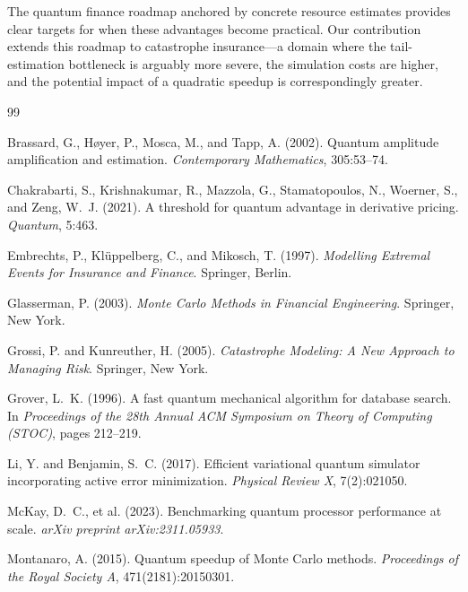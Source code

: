 \documentclass[11pt,a4paper]{article}
\begin{document}
The quantum finance roadmap anchored by concrete resource estimates \cite{Chakrabarti2021, Stamatopoulos2024} provides clear targets for when these advantages become practical. Our contribution extends this roadmap to catastrophe insurance---a domain where the tail-estimation bottleneck is arguably more severe, the simulation costs are higher, and the potential impact of a quadratic speedup is correspondingly greater.



\begin{thebibliography}{99}

Brassard, G., H{\o}yer, P., Mosca, M., and Tapp, A. (2002).
Quantum amplitude amplification and estimation.
\emph{Contemporary Mathematics}, 305:53--74.

Chakrabarti, S., Krishnakumar, R., Mazzola, G., Stamatopoulos, N., Woerner, S., and Zeng, W.~J. (2021).
A threshold for quantum advantage in derivative pricing.
\emph{Quantum}, 5:463.

Embrechts, P., Kl{\"u}ppelberg, C., and Mikosch, T. (1997).
\emph{Modelling Extremal Events for Insurance and Finance}.
Springer, Berlin.

Glasserman, P. (2003).
\emph{Monte Carlo Methods in Financial Engineering}.
Springer, New York.

Grossi, P. and Kunreuther, H. (2005).
\emph{Catastrophe Modeling: A New Approach to Managing Risk}.
Springer, New York.

Grover, L.~K. (1996).
A fast quantum mechanical algorithm for database search.
In \emph{Proceedings of the 28th Annual ACM Symposium on Theory of Computing (STOC)}, pages 212--219.

Li, Y. and Benjamin, S.~C. (2017).
Efficient variational quantum simulator incorporating active error minimization.
\emph{Physical Review X}, 7(2):021050.

McKay, D.~C., et al. (2023).
Benchmarking quantum processor performance at scale.
\emph{arXiv preprint arXiv:2311.05933}.

Montanaro, A. (2015).
Quantum speedup of {Monte Carlo} methods.
\emph{Proceedings of the Royal Society A}, 471(2181):20150301.


\end{thebibliography}
\end{document}
